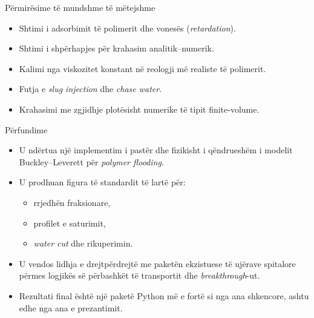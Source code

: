 \documentclass[aspectratio=169]{beamer}
\begin{document}
\begin{frame}{Përmirësime të mundshme të mëtejshme}
\begin{itemize}
  \item Shtimi i adsorbimit të polimerit dhe vonesës (\textit{retardation}).
  \item Shtimi i shpërhapjes për krahasim analitik--numerik.
  \item Kalimi nga viskozitet konstant në reologji më realiste të polimerit.
  \item Futja e \textit{slug injection} dhe \textit{chase water}.
  \item Krahasimi me zgjidhje plotësisht numerike të tipit finite-volume.
\end{itemize}
\end{frame}

\begin{frame}{Përfundime}
\begin{itemize}
  \item U ndërtua një implementim i pastër dhe fizikisht i qëndrueshëm i modelit Buckley--Leverett për \textit{polymer flooding}.
  \item U prodhuan figura të standardit të lartë për:
  \begin{itemize}
    \item rrjedhën fraksionare,
    \item profilet e saturimit,
    \item \textit{water cut} dhe rikuperimin.
  \end{itemize}
  \item U vendos lidhja e drejtpërdrejtë me paketën ekzistuese të ujërave spitalore përmes logjikës së përbashkët të transportit dhe \textit{breakthrough}-ut.
  \item Rezultati final është një paketë Python më e fortë si nga ana shkencore, ashtu edhe nga ana e prezantimit.
\end{itemize}
\end{frame}
\end{document}
